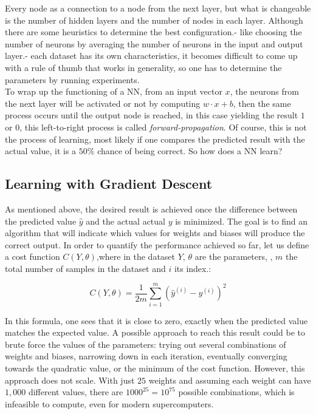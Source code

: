 Every node as a connection to a node from the next layer, but what is changeable is the number of hidden layers and the number of nodes in each layer. Although there are some heuristics to determine the best configuration.- like choosing the number of neurons by averaging the number of neurons in the input and output layer.-  each dataset has its own characteristics, it becomes difficult to come up with a rule of thumb that works in generality, so one has to determine the parameters by running experiments.\cite{nielsenneural}
\\

To wrap up the functioning of a NN,  from an input vector $x$, the neurons from the next layer will be activated or not by computing $w \cdot x + b$, then the same process occurs until the output node is reached, in this case yielding the result $1$ or $0$, this left-to-right process is called \textit{forward-propagation}. Of course, this is not the process of learning, most likely if one compares the predicted result with the actual value, it is a $50 \%$ chance of being correct. So how does a NN learn?

\subsection{Learning with Gradient Descent}

As mentioned above, the desired result is achieved once the difference between the predicted value $\hat{y}$ and the actual actual $y$ is minimized. The goal is to find an algorithm that will indicate which values for weights and biases will produce the correct output. In order to quantify the performance achieved so far, let us define a cost function $C(Y,\theta)$,where in the  dataset $Y$, $\theta$ are the parameters, , $m$ the total number of samples in the dataset and $i$ its index.:

\begin{equation}
	C(Y,\theta) = \frac{1}{2m}\sum_{i=1}^{m}(\hat{y}^{(i)} - y^{(i)})^2
\end{equation}

In this formula, one sees that it is close to zero, exactly when the predicted value matches the expected value. A possible approach to reach this result could be to brute force the values of the parameters: trying out several combinations of weights and biases, narrowing down in each iteration, eventually converging towards the quadratic value, or the minimum of the cost function. However, this approach does not scale. With just $25$ weights and assuming each weight can have $1,000$ different values, there are $1000^{25} =10^{75}$ possible combinations, which is infeasible to compute, even for modern supercomputers\cite{ml_phys}.
\\

